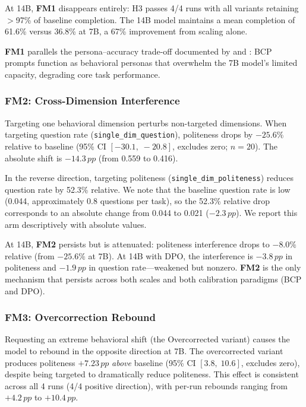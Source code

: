 \documentclass[11pt,a4paper]{article}
\newcommand{\fm}[1]{\textbf{FM#1}}
\newcommand{\pp}{\,pp}
\newcommand{\ci}[2]{[#1,\;#2]}
\begin{document}
At 14B, \fm{1} disappears entirely: H3 passes 4/4 runs with all variants retaining $>$97\% of baseline completion.
The 14B model maintains a mean completion of 61.6\% versus 36.8\% at 7B, a 67\% improvement from scaling alone.

\fm{1} parallels the persona--accuracy trade-off documented by \citet{basil2025playing_pretend} and \citet{hu2026expert_persona}: BCP prompts function as behavioral personas that overwhelm the 7B model's limited capacity, degrading core task performance.

\subsubsection{\fm{2}: Cross-Dimension Interference}
\label{sec:fm2}

Targeting one behavioral dimension perturbs non-targeted dimensions.
When targeting question rate (\texttt{single\_dim\_question}), politeness drops by $-25.6\%$ relative to baseline (95\% CI $\ci{-30.1}{-20.8}$, excludes zero; $n{=}20$).
The absolute shift is $-14.3\pp$ (from 0.559 to 0.416).

In the reverse direction, targeting politeness (\texttt{single\_dim\_politeness}) reduces question rate by 52.3\% relative.
We note that the baseline question rate is low (0.044, approximately 0.8 questions per task), so the 52.3\% relative drop corresponds to an absolute change from 0.044 to 0.021 ($-2.3\pp$).
We report this arm descriptively with absolute values.

At 14B, \fm{2} persists but is attenuated: politeness interference drops to $-8.0\%$ relative (from $-25.6\%$ at 7B).
At 14B with DPO, the interference is $-3.8\pp$ in politeness and $-1.9\pp$ in question rate---weakened but nonzero.
\fm{2} is the only mechanism that persists across both scales and both calibration paradigms (BCP and DPO).

\subsubsection{\fm{3}: Overcorrection Rebound}
\label{sec:fm3}

Requesting an extreme behavioral shift (the Overcorrected variant) causes the model to rebound in the opposite direction at 7B.
The overcorrected variant produces politeness $+7.23\pp$ \emph{above} baseline (95\% CI $\ci{3.8}{10.6}$, excludes zero), despite being targeted to dramatically reduce politeness.
This effect is consistent across all 4 runs (4/4 positive direction), with per-run rebounds ranging from $+4.2\pp$ to $+10.4\pp$.
\end{document}
